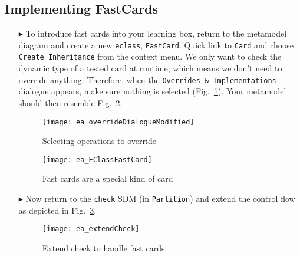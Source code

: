 \newpage
\subsection{Implementing FastCards}
\visHeader
\hypertarget{fastCard vis}{}

\begin{itemize}

\item[$\blacktriangleright$] To introduce fast cards into your learning box, return to the metamodel diagram and create a new \texttt{eclass},
\texttt{FastCard}. Quick link to \texttt{Card} and choose \texttt{Create Inheritance} from the context menu. We only want to check the dynamic type of a
tested card at runtime, which means we don't need to override anything. Therefore, when the \texttt{Overrides \& Implementations} dialogue appears, make sure
nothing is selected (Fig.~\ref{ea:dialogue_override}). Your metamodel should then resemble Fig.~\ref{ea:metamodel_FastCard}.

\vspace{0.5cm}

\begin{figure}[htp]
\begin{center}
  \texttt{[image: ea\_overrideDialogueModified]}
  \caption{Selecting operations to override}  
  \label{ea:dialogue_override}
\end{center}
\end{figure}

\begin{figure}[htp]
\begin{center}
  \texttt{[image: ea\_EClassFastCard]}
  \caption{Fast cards are a special kind of card}  
  \label{ea:metamodel_FastCard}
\end{center}
\end{figure}

\vspace{0.5cm}

\item[$\blacktriangleright$] Now return to the \texttt{check} SDM (in \texttt{Partition}) and extend the control flow as depicted in
Fig.~\ref{ea:extendCheck}.

 \vspace{0.5cm}
 
\begin{figure}[htbp]
\begin{center}
  \texttt{[image: ea\_extendCheck]}
  \caption{Extend check to handle fast cards.}  
  \label{ea:extendCheck}
\end{center}
\end{figure}
 


\end{itemize}
